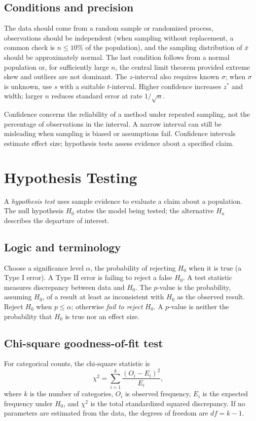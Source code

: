 \documentclass[11pt]{article}
\begin{document}
\subsection{Conditions and precision}
The data should come from a random sample or randomized process, observations
should be independent (when sampling without replacement, a common check is
$n\le10\%$ of the population), and the sampling distribution of $\bar{x}$
should be approximately normal.  The last condition follows from a normal
population or, for sufficiently large $n$, the central limit theorem provided
extreme skew and outliers are not dominant.  The $z$-interval also requires
known $\sigma$; when $\sigma$ is unknown, use $s$ with a suitable
$t$-interval.  Higher confidence increases $z^*$ and width; larger $n$
reduces standard error at rate $1/\sqrt n$.

\begin{keybox}
Confidence concerns the reliability of a method under repeated sampling, not
the percentage of observations in the interval.  A narrow interval can still
be misleading when sampling is biased or assumptions fail.  Confidence
intervals estimate effect size; hypothesis tests assess evidence about a
specified claim.
\end{keybox}

\section{Hypothesis Testing}\label{sec:testing}
A \emph{hypothesis test} uses sample evidence to evaluate a claim about a
population.  The null hypothesis $H_0$ states the model being tested; the
alternative $H_a$ describes the departure of interest.

\subsection{Logic and terminology}
Choose a significance level $\alpha$, the probability of rejecting $H_0$
when it is true (a Type I error).  A Type II error is failing to reject a
false $H_0$.  A test statistic measures discrepancy between data and $H_0$.
The $p$-value is the probability, assuming $H_0$, of a result at least as
inconsistent with $H_0$ as the observed result.  Reject $H_0$ when
$p\le\alpha$; otherwise \emph{fail to reject} $H_0$.  A $p$-value is neither
the probability that $H_0$ is true nor an effect size.

\subsection{Chi-square goodness-of-fit test}
For categorical counts, the chi-square statistic is
\begin{equation}\label{eq:chisq}
\chi^2=\sum_{i=1}^{k}\frac{(O_i-E_i)^2}{E_i},
\end{equation}
where $k$ is the number of categories, $O_i$ is observed frequency, $E_i$ is
the expected frequency under $H_0$, and $\chi^2$ is the total standardized
squared discrepancy.  If no parameters are estimated from the data, the
degrees of freedom are $df=k-1$.
\end{document}
